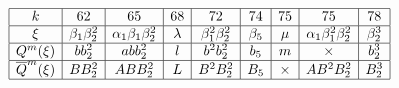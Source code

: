 \documentclass{article}
\begin{document}
\(
\begin{array}{|c|*{11}{c|}}
  \hline
  k & 62 & 65 & 68 & 72 & 74 & 75 & 75 & 78 \\ \hline
  \xi & \beta_1\beta_2^2 & \alpha_1\beta_1\beta_2^2 & \lambda & \beta_1^2\beta_2^2 & \beta_5 & \mu & \alpha_1\beta_1^2\beta_2^2 & \beta_2^3 \\ \hline
  Q^m(\xi) & bb_2^2 & abb_2^2 & l & b^2b_2^2 & b_5 & m & \times & b_2^3 \\ \hline
  \overline{Q}^m(\xi) & BB_2^2 & ABB_2^2 & L & B^2B_2^2 & B_5 & \times & AB^2B_2^2 & B_2^3 \\ \hline
\end{array}
\)
\end{document}
